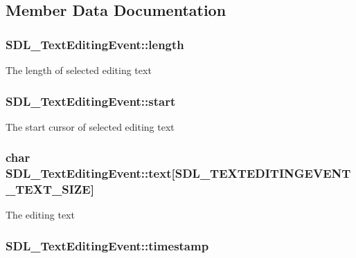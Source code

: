 \subsection{Member Data Documentation}
\subsubsection[{\texorpdfstring{length}{length}}]{ S\+D\+L\+\_\+\+Text\+Editing\+Event\+::length}\hypertarget{struct_s_d_l___text_editing_event_adca95505c0bf212834930df58f6d1aa5}{}\label{struct_s_d_l___text_editing_event_adca95505c0bf212834930df58f6d1aa5}
The length of selected editing text 
\subsubsection[{\texorpdfstring{start}{start}}]{ S\+D\+L\+\_\+\+Text\+Editing\+Event\+::start}\hypertarget{struct_s_d_l___text_editing_event_ac6c6a00835d92b12c0ba5b78b5ad676d}{}\label{struct_s_d_l___text_editing_event_ac6c6a00835d92b12c0ba5b78b5ad676d}
The start cursor of selected editing text 
\subsubsection[{\texorpdfstring{text}{text}}]{\setlength{\rightskip}{0pt plus 5cm}char S\+D\+L\+\_\+\+Text\+Editing\+Event\+::text\mbox{[}{\bf S\+D\+L\+\_\+\+T\+E\+X\+T\+E\+D\+I\+T\+I\+N\+G\+E\+V\+E\+N\+T\+\_\+\+T\+E\+X\+T\+\_\+\+S\+I\+ZE}\mbox{]}}\hypertarget{struct_s_d_l___text_editing_event_a29848c2e7819ea98ae8fb08543e6d420}{}\label{struct_s_d_l___text_editing_event_a29848c2e7819ea98ae8fb08543e6d420}
The editing text 
\subsubsection[{\texorpdfstring{timestamp}{timestamp}}]{ S\+D\+L\+\_\+\+Text\+Editing\+Event\+::timestamp}\hypertarget{struct_s_d_l___text_editing_event_afc164f40abee6fd8e72e01b589210c75}{}\label{struct_s_d_l___text_editing_event_afc164f40abee6fd8e72e01b589210c75}
